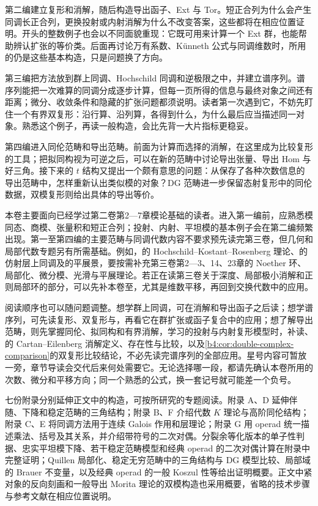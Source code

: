 \ProseParagraphBreak
第二编建立复形和消解，随后构造导出函子、Ext 与 Tor。短正合列为什么会产生同调长正合列，更换投射或内射消解为什么不改变答案，这些都将在相应位置证明。开头的整数例子也会以不同面貌重现：它既可用来计算一个 Ext 群，也能帮助辨认扩张的等价类。后面再讨论万有系数、Künneth 公式与同调维数时，所用的仍是这些基本构造，只是问题换了方向。

\ProseParagraphBreak
第三编把方法放到群上同调、Hochschild 同调和逆极限之中，并建立谱序列。谱序列能把一次难算的同调分成逐步计算，但每一页所得的信息与最终对象之间还有距离；微分、收敛条件和隐藏的扩张问题都须说明。读者第一次遇到它，不妨先盯住一个有界双复形：沿行算、沿列算，各得到什么，为什么最后应当描述同一对象。熟悉这个例子，再读一般构造，会比先背一大片指标更稳妥。

\ProseParagraphBreak
第四编进入同伦范畴和导出范畴。前面为计算而选择的消解，在这里成为比较复形的工具；把拟同构视为可逆之后，可以在新的范畴中讨论导出张量、导出 Hom 与好三角。接下来的 \(t\) 结构又提出一个颇有意思的问题：从保存了各种次数信息的导出范畴中，怎样重新认出类似模的对象？DG 范畴进一步保留态射复形中的同伦数据，双模复形则给出具体的导出等价。

\ProseParagraphBreak
本卷主要面向已经学过第二卷第2—7章模论基础的读者。进入第一编前，应熟悉模同态、商模、张量积和短正合列；投射、内射、平坦模的基本例子会在第二编频繁出现。第一至第四编的主要范畴与同调代数内容不要求预先读完第三卷，但几何和局部代数专题另有所需基础。例如，的 Hochschild--Kostant--Rosenberg 理论、的仿射层上同调及的平展景，要按需补充第三卷第2—3、14、23章的 Noether 环、局部化、微分模、光滑与平展理论。若正在读第三卷关于深度、局部极小消解和正则局部环的部分，可以先补本卷至，尤其是维数平移，再回到交换代数中的应用。

\ProseParagraphBreak
阅读顺序也可以随问题调整。想学群上同调，可在消解和导出函子之后读；想学谱序列，可先读复形、双复形与，再看它在群扩张或函子复合中的应用；想了解导出范畴，则先掌握同伦、拟同构和有界消解，学习的投射与内射复形模型时，补读、的 Cartan--Eilenberg 消解定义、存在性与比较，以及\cref{b4:cor:double-complex-comparison}的双复形比较结论，不必先读完谱序列的全部应用。星号内容可暂放一旁，章节导读会交代后来何处需要它。无论选择哪一段，都请先确认本卷所用的次数、微分和平移方向；同一个熟悉的公式，换一套记号就可能差一个负号。

\ProseParagraphBreak
七份附录分别延伸正文中的构造，可按所研究的专题阅读。附录 A、D 延伸伴随、下降和稳定范畴的三角结构；附录 B、F 介绍代数 \(K\) 理论与高阶同伦结构；附录 C、E 将同调方法用于连续 Galois 作用和层理论；附录 G 用 operad 统一描述乘法、括号及其关系，并介绍带符号的二次对偶。分裂余等化版本的单子性判据、忠实平坦模下降、若干稳定范畴模型和经典 operad 的二次对偶计算在附录中完整证明；Quillen 局部化、稳定无穷范畴中的三角结构与 DG 模型比较、局部域的 Brauer 不变量，以及经典 operad 的一般 Koszul 性等给出证明概要。正文中紧对象的反向刻画和一般导出 Morita 理论的双模构造也采用概要，省略的技术步骤与参考文献在相应位置说明。

